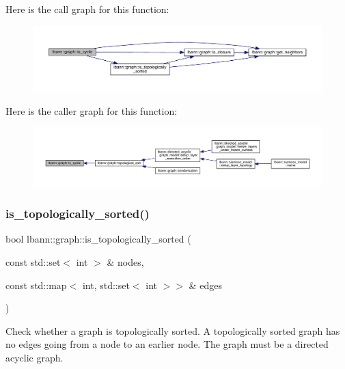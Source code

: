 Here is the call graph for this function\+:\nopagebreak
\begin{figure}[H]
\begin{center}
\leavevmode
\includegraphics[width=350pt]{namespacelbann_1_1graph_a7cb66f3455c79ca9c959bcf2c36a92eb_cgraph}
\end{center}
\end{figure}
Here is the caller graph for this function\+:\nopagebreak
\begin{figure}[H]
\begin{center}
\leavevmode
\includegraphics[width=350pt]{namespacelbann_1_1graph_a7cb66f3455c79ca9c959bcf2c36a92eb_icgraph}
\end{center}
\end{figure}
\mbox{\label{namespacelbann_1_1graph_a0dd9dcef8bc13481677692347530e328}} 
\subsubsection{\texorpdfstring{is\+\_\+topologically\+\_\+sorted()}{is\_topologically\_sorted()}}
{\footnotesize\ttfamily bool lbann\+::graph\+::is\+\_\+topologically\+\_\+sorted (\begin{DoxyParamCaption}\item[{const std\+::set$<$ int $>$ \&}]{nodes,  }\item[{const std\+::map$<$ int, std\+::set$<$ int $>$$>$ \&}]{edges }\end{DoxyParamCaption})}

Check whether a graph is topologically sorted. A topologically sorted graph has no edges going from a node to an earlier node. The graph must be a directed acyclic graph. 

